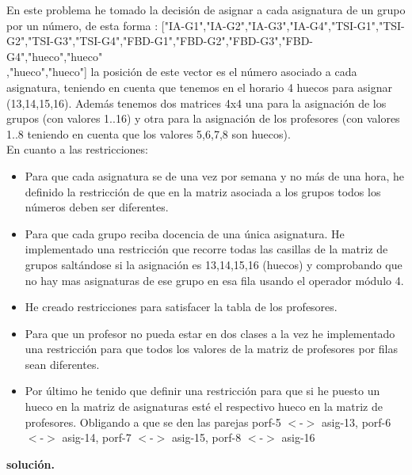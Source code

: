 \documentclass[a4paper,11pt]{article}
\begin{document}
En este problema he tomado la decisión de asignar a cada asignatura de un grupo por un número, de esta forma : ["IA-G1","IA-G2","IA-G3","IA-G4","TSI-G1","TSI-G2","TSI-G3","TSI-G4","FBD-G1","FBD-G2","FBD-G3","FBD-G4","hueco","hueco"\\,"hueco","hueco"] la posición de este vector es el número asociado a cada asignatura, teniendo en cuenta que tenemos en el horario 4 huecos para asignar (13,14,15,16). Además tenemos dos matrices 4x4 una para la asignación de los grupos (con valores 1..16) y otra para la asignación de los profesores (con valores 1..8 teniendo en cuenta que los valores 5,6,7,8 son huecos).\\

En cuanto a las restricciones:

\begin{itemize}

\item Para que cada asignatura se de una vez por semana y no más de una hora, he definido la restricción de que en la matriz asociada a los grupos todos los números deben ser diferentes.

\item Para que cada grupo reciba docencia de una única asignatura. He implementado una restricción que recorre todas las casillas de la matriz de grupos saltándose si la asignación es 13,14,15,16 (huecos) y comprobando que no hay mas asignaturas de ese grupo en esa fila usando el operador módulo 4.

\item He creado restricciones para satisfacer la tabla de los profesores.

\item Para que un profesor no pueda estar en dos clases a la vez he implementado una restricción para que todos los valores de la matriz de profesores por filas sean diferentes.

\item Por último he tenido que definir una restricción para que si he puesto un hueco en la matriz de asignaturas esté el respectivo hueco en la matriz de profesores. Obligando a que se den las parejas porf-5 $<$-$>$ asig-13, porf-6 $<$-$>$ asig-14, porf-7 $<$-$>$ asig-15, porf-8 $<$-$>$ asig-16 

\end{itemize}
\textbf{solución.}
\end{document}
